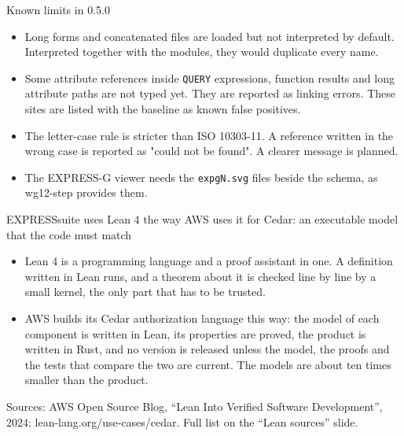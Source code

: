 \documentclass[11pt]{beamer}
\newcommand{\code}[1]{\texttt{#1}}
\begin{document}
\begin{frame}{Known limits in 0.5.0}
  \begin{itemize}
    \item Long forms and concatenated files are loaded but not interpreted by default.
      Interpreted together with the modules, they would duplicate every name.
    \item Some attribute references inside \code{QUERY} expressions, function results and
      long attribute paths are not typed yet. They are reported as linking errors.
      These sites are listed with the baseline as known false positives.
    \item The letter-case rule is stricter than ISO 10303-11. A reference written in
      the wrong case is reported as "could not be found". A clearer message is planned.
    \item The EXPRESS-G viewer needs the \code{expgN.svg} files beside the schema,
      as wg12-step provides them.
  \end{itemize}
\end{frame}

\begin{frame}{EXPRESSsuite uses Lean 4 the way AWS uses it for Cedar: an executable model that the code must match}
  \begin{itemize}
    \item Lean 4 is a programming language and a proof assistant in one. A definition
      written in Lean runs, and a theorem about it is checked line by line by a small
      kernel, the only part that has to be trusted.
    \item AWS builds its Cedar authorization language this way: the model of each component
      is written in Lean, its properties are proved, the product is written in Rust, and
      no version is released unless the model, the proofs and the tests that compare the
      two are current. The models are about ten times smaller than the product.
  \end{itemize}
  \medskip
  \footnotesize\color{sc4grey}
  Sources: AWS Open Source Blog, ``Lean Into Verified Software Development'', 2024;
  lean-lang.org/use-cases/cedar. Full list on the ``Lean sources'' slide.
\end{frame}
\end{document}
